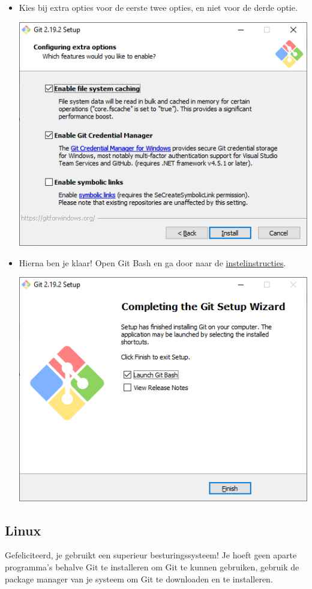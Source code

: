 \documentclass[a4paper]{extarticle}
\begin{document}
\begin{itemize}
		\clearpage

	\item Kies bij extra opties voor de eerste twee opties, en niet voor de derde optie.
		\begin{center}
			\includegraphics[width=0.75\linewidth]{windows-screenshots/7}
		\end{center}

	\item Hierna ben je klaar! Open Git Bash en ga door naar de \hyperref[instellen]{instelinstructies}.
		\begin{center}
			\includegraphics[width=0.75\linewidth]{windows-screenshots/8}
		\end{center}
\end{itemize}

\clearpage
\subsection{Linux}
Gefeliciteerd, je gebruikt een superieur besturingssysteem! Je hoeft geen aparte programma's behalve Git te installeren
om Git te kunnen gebruiken, gebruik de package manager van je systeem om Git te downloaden en te installeren.
\end{document}
